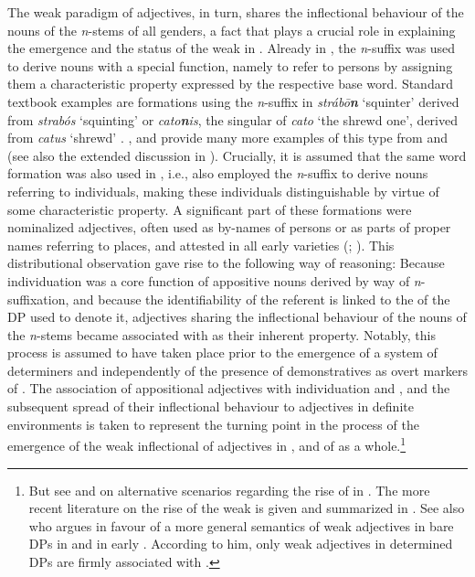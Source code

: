 \documentclass[output=paper,colorlinks,citecolor=brown]{langscibook}
\begin{document}
The weak paradigm of adjectives, in turn, shares the inflectional
behaviour of the nouns of the \emph{n}-stems of all genders, a fact that
plays a crucial role in explaining the emergence and the status of the
weak  in . Already in , the \emph{n}-suffix
was used to derive nouns with a special function, namely to refer to
persons by assigning them a characteristic property
expressed by the respective base word. Standard textbook examples are
formations using the \emph{n}-suffix in  \emph{strábō\textbf{n}}
`squinter' derived from \emph{strabós} `squinting' or 
\emph{cato\textbf{n}is}, the  singular of \emph{cato} `the
shrewd one', derived from \emph{catus} `shrewd' \citep[298]{Braune2018AHD}.
\citet[46--47]{Osthoff1876}, \citet[196]{Delbruck09} and \citet[171]{behaghel1923deutsche}
provide many more examples of this type from  and  (see also
the extended discussion in \citealp[6--12]{Trutmann72}). Crucially, it is
assumed that the same word formation  was also used in ,
i.e.,  also employed the \emph{n}-suffix to derive nouns
referring to individuals, making these individuals distinguishable by
virtue of some characteristic property. A significant part of these
formations were nominalized adjectives, often used as by-names of
persons or as parts of proper names referring to places, and attested in
all early  varieties (\citealp[746]{Wilmanns09}; \citealp{Kogel89}). This distributional observation gave rise to the
following way of reasoning: Because individuation was a core function of
appositive nouns derived by way of \emph{n}-suffixation, and because the
identifiability of the referent is linked to the  of the DP
used to denote it, adjectives sharing the inflectional behaviour of the
nouns of the \emph{n}-stems became associated with  as their
inherent property. Notably, this process is assumed to have taken place
prior to the emergence of a system of determiners and independently of
the presence of demonstratives as overt markers of . The
association of appositional adjectives with individuation and
, and the subsequent spread of their inflectional behaviour
to adjectives in definite environments is taken to represent the turning
point in the process of the emergence of the weak inflectional 
of adjectives in , and of   as a
whole.\footnote{But see \citet{Trutmann72} and \citet{ratkus2011} on alternative
  scenarios regarding the rise of   in . The more
  recent literature on the rise of the weak  is
  given and summarized in \citet[footnote 1]{ratkus2011}. See also \citet{ratkus2018weak} who argues in favour of a more general semantics of weak
  adjectives in bare DPs in  and in early . According to
  him, only weak adjectives in determined DPs are firmly associated with
  .}
\end{document}
